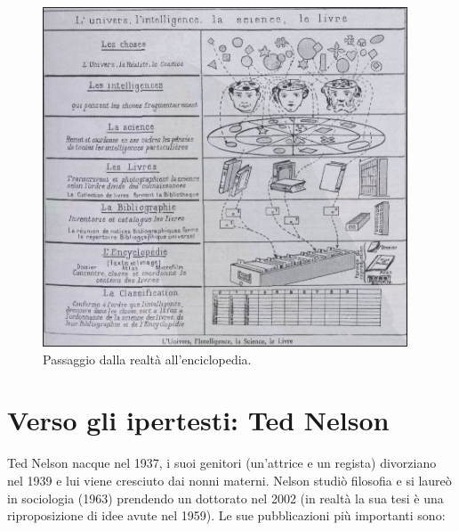 
\begin{figure}[h]
    \centering
    \includegraphics[scale=0.5]{images/Ot.png}
    \caption{Passaggio dalla realtà all'enciclopedia.}
\end{figure}

\section{Verso gli ipertesti: Ted Nelson}

Ted Nelson nacque nel 1937, i suoi genitori (un'attrice e un regista) divorziano nel 1939 e lui viene cresciuto dai nonni
materni. Nelson studiò filosofia e si laureò in sociologia (1963) prendendo un dottorato nel 
2002 (in realtà la sua tesi è una riproposizione di idee avute nel 1959).
Le sue pubblicazioni più importanti sono:

